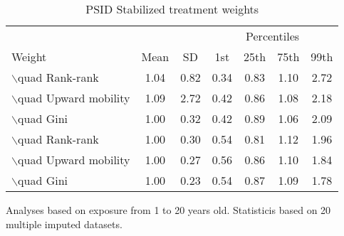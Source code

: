 \begin{table}[htp]
\centering
\footnotesize
\setlength{\tabcolsep}{10pt}
\renewcommand{\arraystretch}{1}
\begin{threeparttable}
\centering
\caption{PSID Stabilized treatment weights} 
\label{tab:psid_ipt_weigths}
\begin{tabular}{lcccccc}
  \hline
\multicolumn{3}{c}{} & \multicolumn{4}{c}{Percentiles} \\ 
 \cmidrule{4-7} 
Weight & Mean & SD & 1st & 25th & 75th & 99th \\ 
  \hline
$\backslash$quad Rank-rank & 1.04 & 0.82 & 0.34 & 0.83 & 1.10 & 2.72 \\ 
  $\backslash$quad Upward mobility & 1.09 & 2.72 & 0.42 & 0.86 & 1.08 & 2.18 \\ 
  $\backslash$quad Gini & 1.00 & 0.32 & 0.42 & 0.89 & 1.06 & 2.09 \\ 
  $\backslash$quad Rank-rank & 1.00 & 0.30 & 0.54 & 0.81 & 1.12 & 1.96 \\ 
  $\backslash$quad Upward mobility & 1.00 & 0.27 & 0.56 & 0.86 & 1.10 & 1.84 \\ 
  $\backslash$quad Gini & 1.00 & 0.23 & 0.54 & 0.87 & 1.09 & 1.78 \\ 
   \hline
\end{tabular}
\begin{tablenotes}
\footnotesize
\item Analyses based on exposure from 1 to 20 years old. Statisticis based on  20 multiple imputed datasets.
\end{tablenotes}
\end{threeparttable}
\end{table}
